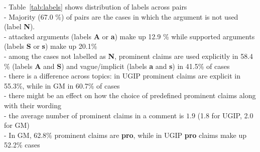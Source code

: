 \noindent - Table~\ref{tab:labels} shows distribution of labels across pairs \\
- Majority (67.0 \%) of pairs are the cases in which the argument is not used
(label \textbf{N}). \\
- attacked arguments (labels \textbf{A} or \textbf{a}) make up 12.9 \% while supported
arguments (labels \textbf{S} or \textbf{s}) make up 20.1\% \\
- among the cases not labelled as \textbf{N}, prominent claims are used explicitly 
in 58.4 \% (labels \textbf{A} and \textbf{S}) and vague/implicit (labels \textbf{a} and \textbf{s})
in 41.5\% of cases \\
- there is a difference across topics: in UGIP prominent claims are explicit in 55.3\%, while in 
GM in 60.7\% of cases \\
- there might be an effect on how the choice of predefined prominent claims along with their 
wording \\
- the average number of prominent claims in a comment is $1.9$ (1.8 for UGIP, 2.0 for GM) \\
- In GM, 62.8\% prominent claims are \textbf{pro}, while in UGIP \textbf{pro} claims 
make up 52.2\% cases \\

